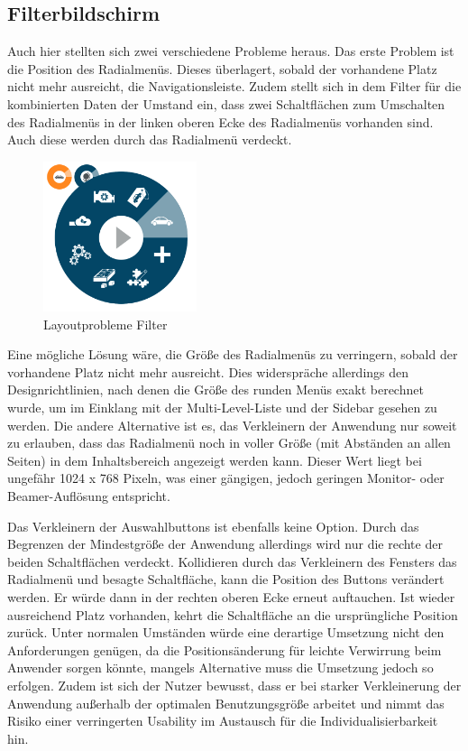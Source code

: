 \subsection{Filterbildschirm}
Auch hier stellten sich zwei verschiedene Probleme heraus. Das erste Problem ist die Position des Radialmenüs. Dieses überlagert, sobald der vorhandene Platz nicht mehr ausreicht, die Navigationsleiste. Zudem stellt sich in dem Filter für die kombinierten Daten der Umstand ein, dass zwei Schaltflächen zum Umschalten des Radialmenüs in der linken oberen Ecke des Radialmenüs vorhanden sind. Auch diese werden durch das Radialmenü verdeckt.\par
\begin{figure}[H]
 \centering
 \includegraphics[width=0.4\textwidth]{grafiken/radial_bug2.png}
 \caption{Layoutprobleme Filter}
 \label{fig:layoutLtueFilter}
\end{figure}
Eine mögliche Lösung wäre, die Größe des Radialmenüs zu verringern, sobald der vorhandene Platz nicht mehr ausreicht. Dies widerspräche allerdings den Designrichtlinien, nach denen die Größe des runden Menüs exakt berechnet wurde, um im Einklang mit der Multi-Level-Liste und der Sidebar gesehen zu werden. Die andere Alternative ist es, das Verkleinern der Anwendung nur soweit zu erlauben, dass das Radialmenü noch in voller Größe (mit Abständen an allen Seiten) in dem Inhaltsbereich angezeigt werden kann. Dieser Wert liegt bei ungefähr 1024 x 768 Pixeln, was einer gängigen, jedoch geringen Monitor- oder Beamer-Auflösung entspricht.\par
Das Verkleinern der Auswahlbuttons ist ebenfalls keine Option. Durch das Begrenzen der Mindestgröße der Anwendung allerdings wird nur die rechte der beiden Schaltflächen verdeckt. Kollidieren durch das Verkleinern des Fensters das Radialmenü und besagte Schaltfläche, kann die Position des Buttons verändert werden. Er würde dann in der rechten oberen Ecke erneut auftauchen. Ist wieder ausreichend Platz vorhanden, kehrt die Schaltfläche an die ursprüngliche Position zurück. Unter normalen Umständen würde eine derartige Umsetzung nicht den Anforderungen genügen, da die Positionsänderung für leichte Verwirrung beim Anwender sorgen könnte, mangels Alternative muss die Umsetzung jedoch so erfolgen. Zudem ist sich der Nutzer bewusst, dass er bei starker Verkleinerung der Anwendung außerhalb der optimalen Benutzungsgröße arbeitet und nimmt das Risiko einer verringerten Usability im Austausch für die Individualisierbarkeit hin.\par
